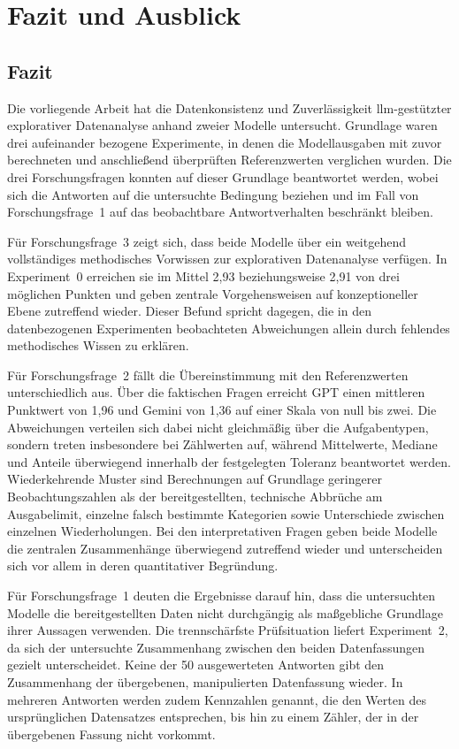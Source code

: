 \chapter{Fazit und Ausblick}
\label{ch:fazit}

\section{Fazit}
\label{sec:fazit}

Die vorliegende Arbeit hat die Datenkonsistenz und Zuverlässigkeit \gls{llm}-gestützter explorativer Datenanalyse anhand zweier Modelle untersucht. Grundlage waren drei aufeinander bezogene Experimente, in denen die Modellausgaben mit zuvor berechneten und anschließend überprüften Referenzwerten verglichen wurden. Die drei Forschungsfragen konnten auf dieser Grundlage beantwortet werden, wobei sich die Antworten auf die untersuchte Bedingung beziehen und im Fall von Forschungsfrage~1 auf das beobachtbare Antwortverhalten beschränkt bleiben.

Für Forschungsfrage~3 zeigt sich, dass beide Modelle über ein weitgehend vollständiges methodisches Vorwissen zur explorativen Datenanalyse verfügen. In Experiment~0 erreichen sie im Mittel 2,93 beziehungsweise 2,91 von drei möglichen Punkten und geben zentrale Vorgehensweisen auf konzeptioneller Ebene zutreffend wieder. Dieser Befund spricht dagegen, die in den datenbezogenen Experimenten beobachteten Abweichungen allein durch fehlendes methodisches Wissen zu erklären.

Für Forschungsfrage~2 fällt die Übereinstimmung mit den Referenzwerten unterschiedlich aus. Über die faktischen Fragen erreicht GPT einen mittleren Punktwert von 1,96 und Gemini von 1,36 auf einer Skala von null bis zwei. Die Abweichungen verteilen sich dabei nicht gleichmäßig über die Aufgabentypen, sondern treten insbesondere bei Zählwerten auf, während Mittelwerte, Mediane und Anteile überwiegend innerhalb der festgelegten Toleranz beantwortet werden. Wiederkehrende Muster sind Berechnungen auf Grundlage geringerer Beobachtungszahlen als der bereitgestellten, technische Abbrüche am Ausgabelimit, einzelne falsch bestimmte Kategorien sowie Unterschiede zwischen einzelnen Wiederholungen. Bei den interpretativen Fragen geben beide Modelle die zentralen Zusammenhänge überwiegend zutreffend wieder und unterscheiden sich vor allem in deren quantitativer Begründung.

Für Forschungsfrage~1 deuten die Ergebnisse darauf hin, dass die untersuchten Modelle die bereitgestellten Daten nicht durchgängig als maßgebliche Grundlage ihrer Aussagen verwenden. Die trennschärfste Prüfsituation liefert Experiment~2, da sich der untersuchte Zusammenhang zwischen den beiden Datenfassungen gezielt unterscheidet. Keine der 50 ausgewerteten Antworten gibt den Zusammenhang der übergebenen, manipulierten Datenfassung wieder. In mehreren Antworten werden zudem Kennzahlen genannt, die den Werten des ursprünglichen Datensatzes entsprechen, bis hin zu einem Zähler, der in der übergebenen Fassung nicht vorkommt.

